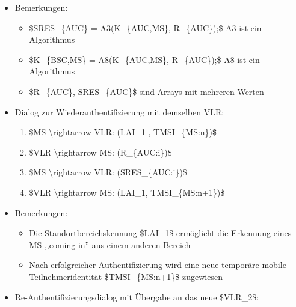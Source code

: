 \documentclass[a4paper]{article}
\begin{document}
\begin{multicols}{3}
    \begin{itemize}
        \item
              Bemerkungen:

              \begin{itemize}
                  \item
                        \$SRES\_\{AUC\} = A3(K\_\{AUC,MS\}, R\_\{AUC\});\$ A3 ist ein
                        Algorithmus
                  \item
                        \$K\_\{BSC,MS\} = A8(K\_\{AUC,MS\}, R\_\{AUC\});\$ A8 ist ein
                        Algorithmus
                  \item
                        \$R\_\{AUC\}, SRES\_\{AUC\}\$ sind Arrays mit mehreren Werten
              \end{itemize}
        \item
              Dialog zur Wiederauthentifizierung mit demselben VLR:

              \begin{enumerate}
                  \def\labelenumi{\arabic{enumi}.}
                  \item
                        \$MS \textbackslash rightarrow VLR: (LAI\_1 , TMSI\_\{MS:n\})\$
                  \item
                        \$VLR \textbackslash rightarrow MS: (R\_\{AUC:i\})\$
                  \item
                        \$MS \textbackslash rightarrow VLR: (SRES\_\{AUC:i\})\$
                  \item
                        \$VLR \textbackslash rightarrow MS: (LAI\_1, TMSI\_\{MS:n+1\})\$
              \end{enumerate}
        \item
              Bemerkungen:

              \begin{itemize}
                  \item
                        Die Standortbereichskennung \$LAI\_1\$ ermöglicht die Erkennung
                        eines MS ,,coming in'' aus einem anderen Bereich
                  \item
                        Nach erfolgreicher Authentifizierung wird eine neue temporäre mobile
                        Teilnehmeridentität \$TMSI\_\{MS:n+1\}\$ zugewiesen
              \end{itemize}
        \item
              Re-Authentifizierungsdialog mit Übergabe an das neue \$VLR\_2\$:


\end{itemize}
\end{multicols}
\end{document}
